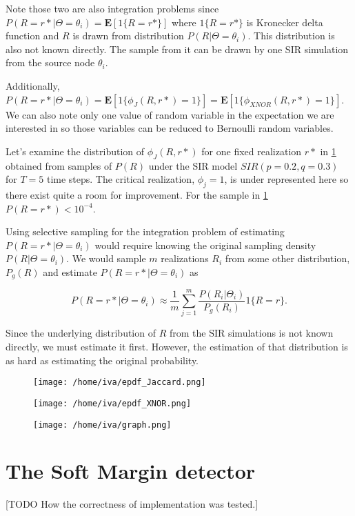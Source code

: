 \documentclass[times, utf8, diplomski]{fer}
\begin{document}
Note those two are also integration problems since $P(R = r* | \Theta = \theta_i) = \mathbf{E}[1\{R = r*\}] $ where $1\{R = r*\}$ is Kronecker delta function and $R$ is drawn from distribution $P(R|\Theta = \theta_i)$. This distribution is also not known directly. The sample from it can be drawn by one SIR simulation from the source node $\theta_i$. 

Additionally, $P(R = r* | \Theta = \theta_i) = \mathbf{E}[1\{\phi_J(R, r*) = 1\}] = \mathbf{E}[1\{\phi_{XNOR}(R, r*) = 1\}]$. We can also note only one value of random variable in the expectation we are interested in so those variables can be reduced to Bernoulli random variables.

Let's examine the distribution of $\phi_J(R, r*)$ for one fixed realization $r*$  in \ref{slika} obtained from samples of $P(R)$ under the SIR model $SIR(p = 0.2, q = 0.3)$ for $T = 5$ time steps. The critical  realization, $\phi_j = 1$, is under represented here so there exist quite a room for improvement. For the sample in \ref{slika} $P(R = r *) < 10^{-4}$. 

Using selective sampling for the integration problem of estimating $P(R = r* | \Theta = \theta_i)$ would require knowing the original sampling density $P(R | \Theta = \theta_i)$. We would sample $m$ realizations $R_i$ from some other distribution, $P_{g}(R)$ and estimate $P(R = r*| \Theta = \theta_i)$ as 

\begin{equation*}
P(R = r* | \Theta = \theta_i) \approx \frac{1}{m} \sum_{j = 1}^{m} \frac{P(R_i | \Theta_i)}{P_{g}(R_i)} 1\{R = r\}.
\end{equation*}

Since the underlying distribution of $R$ from the SIR simulations is not known directly, we must estimate it first. However, the estimation of that distribution is as hard as estimating the original probability. 

\begin{figure}[h]
\texttt{[image: /home/iva/epdf\_Jaccard.png]}
\end{figure}
\begin{figure}[h]
\texttt{[image: /home/iva/epdf\_XNOR.png]}
\end{figure}

\begin{figure}[h]
\texttt{[image: /home/iva/graph.png]}
\label{slika}
\end{figure}


\section{The Soft Margin detector}
[TODO How the correctness of implementation was tested.]
\end{document}
